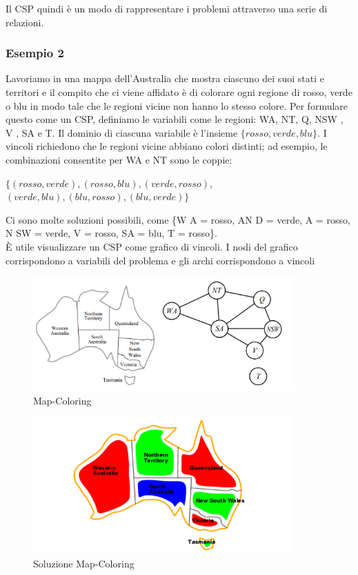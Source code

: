 \noindent Il CSP quindi è un modo di rappresentare i problemi attraverso una
serie di relazioni.
\vspace{0.2cm}

\subsubsection{Esempio 2}
Lavoriamo in una mappa dell'Australia che mostra ciascuno dei suoi stati e
territori e il compito che ci viene affidato è di colorare ogni regione di
rosso, verde o blu in modo tale che le regioni vicine non hanno lo stesso
colore. Per formulare questo come un CSP, definiamo le variabili come le
regioni: WA, NT, Q, NSW , V , SA e T. Il dominio di ciascuna variabile è
l'insieme $\{rosso, verde, blu\}$. I vincoli richiedono che le regioni vicine
abbiano colori distinti; ad esempio, le combinazioni consentite per WA e NT sono
le coppie:

\begin{center}
    $\{(rosso, verde), (rosso, blu), (verde, rosso),$
    $ (verde, blu), (blu, rosso),
        (blu, verde)\}$
\end{center}

Ci sono molte soluzioni possibili, come \{W A = rosso, AN D = verde, A = rosso,
N SW = verde, V = rosso, SA = blu, T = rosso\}. \\È utile visualizzare un CSP
come grafico di vincoli. I nodi del grafico corrispondono a variabili del
problema e gli archi corrispondono a vincoli
\begin{figure}[H]
    \centering
    \includegraphics[width=10cm, keepaspectratio]{img/Cap1/map-coloring1.png}
    \caption{Map-Coloring}
\end{figure}
\begin{figure}[H]
    \centering
    \includegraphics[width=10cm, keepaspectratio]{img/Cap1/map-coloring2.png}
    \caption{Soluzione Map-Coloring}
\end{figure}

